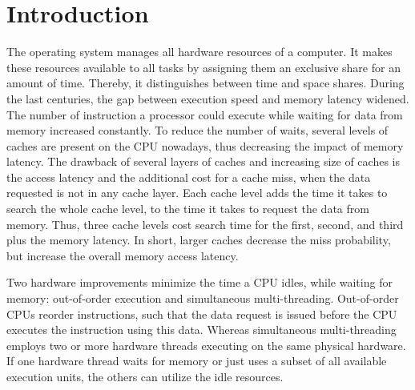 \chapter{Introduction}
\label{sec:intro}



The operating system manages all hardware resources of a computer.
It makes these resources available to all tasks by assigning them an exclusive
share for an amount of time.
Thereby, it distinguishes between time and space shares.
During the last centuries, the gap between execution speed and memory latency
widened.
The number of instruction a processor could execute while waiting for data
from memory increased constantly.
To reduce the number of waits, several levels of caches are present on the CPU
nowadays, thus decreasing the impact of memory latency.
The drawback of several layers of caches and increasing size of caches is the
access latency and the additional cost for a cache miss, when the data
requested is not in any cache layer.
Each cache level adds the time it takes to search the whole cache level, to the
time it takes to request the data from memory.
Thus, three cache levels cost search time for the first, second, and third plus
the memory latency.
In short, larger caches decrease the miss probability, but increase the overall
memory access latency.

Two hardware improvements minimize the time a CPU idles, while waiting for memory: out-of-order
execution and simultaneous multi-threading.
Out-of-order CPUs reorder instructions, such that the data request is issued
before the CPU executes the instruction using this data.
Whereas simultaneous multi-threading employs two or more hardware threads
executing on the same physical hardware.
If one hardware thread waits for memory or just uses a subset of all available
execution units, the others can utilize the idle resources.

